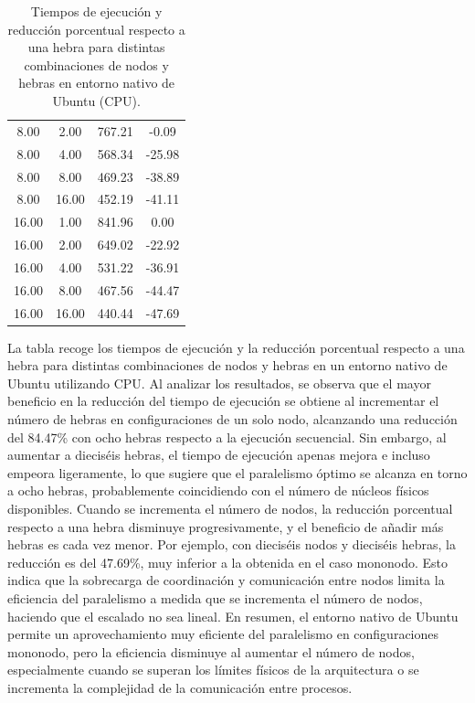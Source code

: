 \begin{table}[ht]
\begin{tabular}{|c|c|c|c|}
        8.00           & 2.00            & 767.21              & -0.09                          \\
        8.00           & 4.00            & 568.34              & -25.98                         \\
        8.00           & 8.00            & 469.23              & -38.89                         \\
        8.00           & 16.00           & 452.19              & -41.11                         \\
        16.00          & 1.00            & 841.96              & 0.00                           \\
        16.00          & 2.00            & 649.02              & -22.92                         \\
        16.00          & 4.00            & 531.22              & -36.91                         \\
        16.00          & 8.00            & 467.56              & -44.47                         \\
        16.00          & 16.00           & 440.44              & -47.69                         \\
        \hline
    \end{tabular}
    \caption{Tiempos de ejecución y reducción porcentual respecto a una hebra para distintas combinaciones de nodos y hebras en entorno nativo de Ubuntu (CPU).}
    \label{tab:thread_sweep_ubuntu_cpu_native}
\end{table}

La tabla recoge los tiempos de ejecución y la reducción porcentual respecto a una hebra para distintas combinaciones de nodos y hebras en un entorno nativo de Ubuntu utilizando CPU. Al analizar los resultados, se observa que el mayor beneficio en la reducción del tiempo de ejecución se obtiene al incrementar el número de hebras en configuraciones de un solo nodo, alcanzando una reducción del 84.47\% con ocho hebras respecto a la ejecución secuencial. Sin embargo, al aumentar a dieciséis hebras, el tiempo de ejecución apenas mejora e incluso empeora ligeramente, lo que sugiere que el paralelismo óptimo se alcanza en torno a ocho hebras, probablemente coincidiendo con el número de núcleos físicos disponibles. Cuando se incrementa el número de nodos, la reducción porcentual respecto a una hebra disminuye progresivamente, y el beneficio de añadir más hebras es cada vez menor. Por ejemplo, con dieciséis nodos y dieciséis hebras, la reducción es del 47.69\%, muy inferior a la obtenida en el caso mononodo. Esto indica que la sobrecarga de coordinación y comunicación entre nodos limita la eficiencia del paralelismo a medida que se incrementa el número de nodos, haciendo que el escalado no sea lineal. En resumen, el entorno nativo de Ubuntu permite un aprovechamiento muy eficiente del paralelismo en configuraciones mononodo, pero la eficiencia disminuye al aumentar el número de nodos, especialmente cuando se superan los límites físicos de la arquitectura o se incrementa la complejidad de la comunicación entre procesos.

